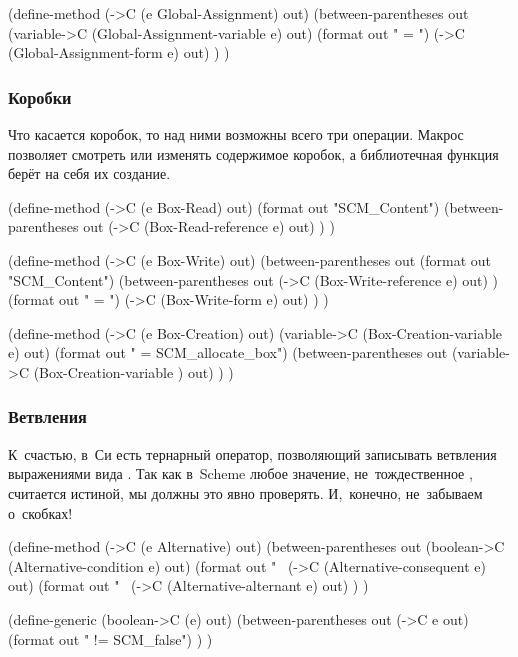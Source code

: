 \begin{code:lisp}
(define-method (->C (e Global-Assignment) out)
  (between-parentheses out
    (variable->C (Global-Assignment-variable e) out)
    (format out " = ")
    (->C (Global-Assignment-form e) out) ) )
\end{code:lisp}


\subsubsection{Коробки}\label{cc/gen/exprs/sssect:boxes}

Что касается коробок, то над ними возможны всего три операции. Макрос
 позволяет смотреть или изменять содержимое коробок, а
библиотечная функция  берёт на себя их создание.

\begin{code:lisp}
(define-method (->C (e Box-Read) out)
  (format out "SCM_Content")
  (between-parentheses out
    (->C (Box-Read-reference e) out) ) )

(define-method (->C (e Box-Write) out)
  (between-parentheses out
    (format out "SCM_Content")
    (between-parentheses out
      (->C (Box-Write-reference e) out) )
    (format out " = ")
    (->C (Box-Write-form e) out) ) )

(define-method (->C (e Box-Creation) out)
  (variable->C (Box-Creation-variable e) out)
  (format out " = SCM_allocate_box")
  (between-parentheses out
    (variable->C (Box-Creation-variable ) out) ) )
\end{code:lisp}


\subsubsection{Ветвления}\label{cc/gen/exprs/sssect:alternatives}

К~счастью, в~Си есть тернарный оператор, позволяющий записывать ветвления
выражениями вида . Так как в~Scheme любое
значение, не~тождественное , считается истиной, мы должны это явно
проверять. И,~конечно, не~забываем о~скобках!

\begin{code:lisp}
(define-method (->C (e Alternative) out)
  (between-parentheses out
    (boolean->C (Alternative-condition e) out)
    (format out "~%
    (->C (Alternative-consequent e) out)
    (format out "~%
    (->C (Alternative-alternant e) out) ) )

(define-generic (boolean->C (e) out)
  (between-parentheses out
    (->C e out)
    (format out " != SCM_false") ) )
\end{code:lisp}

